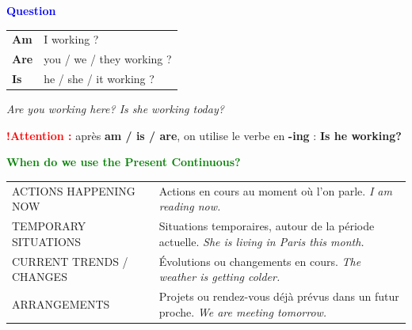 \documentclass[a4paper,10pt]{article}
\newcommand{\sectiontitle}[2]{%
  {\large\bfseries\textcolor{#1}{#2}}%
}
\begin{document}
\begin{bluebox}
  \sectiontitle{Blue}{Question}

  \vspace{0.75mm}
  \begin{tabularx}{\textwidth}{@{}>{\color{Blue}\bfseries}l X@{}}
    Am & I working ?\\
    Are & you / we / they working ?\\
    Is & he / she / it working ?
  \end{tabularx}

  \vspace{0.75mm}
  \textit{Are you working here? \qquad Is she working today?}

  \vspace{1mm}
  \begin{tcolorbox}[
    colback=RedLight,colframe=RedLight,boxrule=0pt,
    arc=2mm,left=2.7mm,right=2.7mm,top=1.25mm,bottom=1.25mm
  ]
    \textcolor{Red}{\bfseries !\quad Attention :}
    après \textbf{am / is / are}, on utilise le verbe en
    \textbf{-ing} : \textbf{Is he working?}
  \end{tcolorbox}
\end{bluebox}

\vspace{1.35mm}

\begin{greenbox}
  \sectiontitle{Green}{When do we use the Present Continuous?}

  \vspace{1mm}

  \begin{tabularx}{\textwidth}{@{}p{} X@{}}
    ACTIONS HAPPENING NOW &
      Actions en cours au moment où l'on parle.
      \newline \textit{I am reading now.}\\[0.7mm]

    TEMPORARY SITUATIONS &
      Situations temporaires, autour de la période actuelle.
      \newline \textit{She is living in Paris this month.}\\[0.7mm]

    CURRENT TRENDS / CHANGES &
      Évolutions ou changements en cours.
      \newline \textit{The weather is getting colder.}\\[0.7mm]

    ARRANGEMENTS &
      Projets ou rendez-vous déjà prévus dans un futur proche.
      \newline \textit{We are meeting tomorrow.}
  \end{tabularx}
\end{greenbox}
\end{document}
